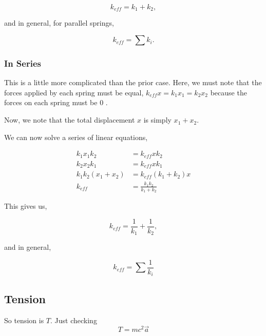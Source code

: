 \begin{equation*}
    \boxed{k_{eff} = k_1 + k_2},
\end{equation*}

and in general, for parallel springs, 

\begin{equation}
    \boxed{k_{eff} = \sum k_i.}
\end{equation}

\subsubsection{In Series}

This is a little more complicated than the prior case. Here, 
we must note that the forces applied by each spring must be equal, 
\(k_{eff}x = k_1x_1 = k_2x_2\) because 
the forces on each spring must be \(0\) .

Now, we note that the total displacement \(x\) is simply \(x_1 + x_2\). 

We can now solve a series of linear equations,

\begin{align*}
    k_1x_1k_2 &= k_{eff} xk_2 \\
    k_2x_2k_1 &= k_{eff} xk_1 \\
    k_1k_2(x_1 + x_2) &= k_{eff}(k_1 + k_2) x\\
    k_{eff} &= \frac{k_1k_2}{k_1 + k_2}
\end{align*}

This gives us, 

\begin{equation*}
    k_{eff} = \frac{1}{k_1} + \frac{1}{k_2},
\end{equation*}

and in general,

\begin{equation}
    \boxed{k_{eff} = \sum \frac{1}{k_i}}
\end{equation}

\subsection{Tension}

So tension is \(T\). Just checking 
\[
    T = mc^2 \Vec{a} 
\]

